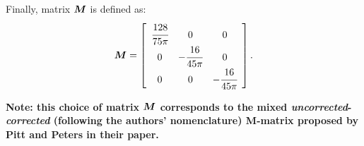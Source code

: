 %

Finally, matrix $\bm{M}$ is defined as:
\begin{equation}\label{eq:Mdef}
\bm{M} = \left[
\begin{array}{ccc}
\cfrac{128}{75 \pi} & 0  & 0 \\
0 & -\cfrac{16}{45 \pi} & 0 \\
0 & 0 & -\cfrac{16}{45 \pi}
\end{array}
\right].
\end{equation}

\textbf{Note: this choice of matrix $\bm{M}$ corresponds
to the mixed \emph{uncorrected}-\emph{corrected} (following
the authors' nomenclature) M-matrix proposed by Pitt and Peters 
in their paper.}






